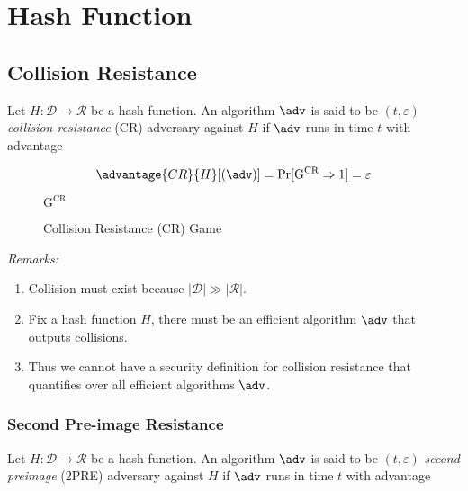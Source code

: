 \newpage
\section{Hash Function}


\subsection{Collision Resistance} Let $H: \mathcal{D} \rightarrow \mathcal{R}$ be a hash function. An algorithm $\adv$ is said to be $(t,\varepsilon)$ \textit{collision resistance} (CR) adversary against $H$ if $\adv$ runs in time $t$ with advantage

$$
\advantage{CR}{H}[(\adv)] = \Pr[\mathrm{G}^\text{CR} \Rightarrow 1] = \varepsilon
$$ 

\begin{figure}[!h]
\centering
\begin{codeframe}[colback = white, width=7.25cm, height=4cm]{$\mathrm{G}^{\text{CR}}$}
\begin{pchstack}
\end{pchstack}
\end{codeframe}
\caption{Collision Resistance (CR) Game}
\label{fig:cr-game}
\end{figure}

\bigskip
\textit{Remarks:}
\begin{enumerate}
	\item Collision must exist because $|\mathcal{D}| \gg |\mathcal{R}|$.
	\item Fix a hash function $H$, there must be an efficient algorithm $\adv$ that outputs collisions. 
	\item Thus we cannot have a security definition for collision resistance that quantifies over all efficient algorithms $\adv$. 
\end{enumerate}




\subsubsection{Second Pre-image Resistance}
Let $H: \mathcal{D} \rightarrow \mathcal{R}$ be a hash function. An algorithm $\adv$ is said to be $(t,\varepsilon)$ \textit{second preimage} (2PRE) adversary against $H$ if $\adv$ runs in time $t$ with advantage  

